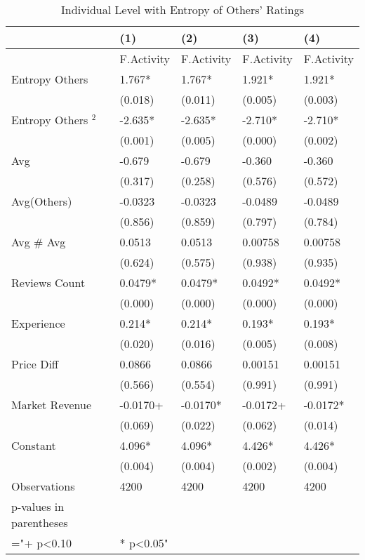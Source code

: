\begin{table}
\centering
\begin{tabular}{@{}lllll@{}}
\toprule
 & (1) & (2) & (3) & (4) \\ \midrule
 & F.Activity & F.Activity & F.Activity & F.Activity \\
Entropy Others & 1.767* & 1.767* & 1.921* & 1.921* \\
 & (0.018) & (0.011) & (0.005) & (0.003) \\
Entropy Others $^2$ & -2.635* & -2.635* & -2.710* & -2.710* \\
 & (0.001) & (0.005) & (0.000) & (0.002) \\
Avg & -0.679 & -0.679 & -0.360 & -0.360 \\
 & (0.317) & (0.258) & (0.576) & (0.572) \\
Avg(Others) & -0.0323 & -0.0323 & -0.0489 & -0.0489 \\
 & (0.856) & (0.859) & (0.797) & (0.784) \\
Avg \# Avg & 0.0513 & 0.0513 & 0.00758 & 0.00758 \\
 & (0.624) & (0.575) & (0.938) & (0.935) \\
Reviews Count & 0.0479* & 0.0479* & 0.0492* & 0.0492* \\
 & (0.000) & (0.000) & (0.000) & (0.000) \\
Experience & 0.214* & 0.214* & 0.193* & 0.193* \\
 & (0.020) & (0.016) & (0.005) & (0.008) \\
Price Diff & 0.0866 & 0.0866 & 0.00151 & 0.00151 \\
 & (0.566) & (0.554) & (0.991) & (0.991) \\
Market Revenue & -0.0170+ & -0.0170* & -0.0172+ & -0.0172* \\
 & (0.069) & (0.022) & (0.062) & (0.014) \\
Constant & 4.096* & 4.096* & 4.426* & 4.426* \\
 & (0.004) & (0.004) & (0.002) & (0.004) \\
Observations & 4200 & 4200 & 4200 & 4200 \\
p-values in parentheses &  &  &  &  \\
="+ p\textless{}0.10 & * p\textless{}0.05" &  &  &  \\ \bottomrule
\end{tabular}
\caption{Individual Level with Entropy of Others' Ratings}
\label{reg_ind_11}
\end{table}